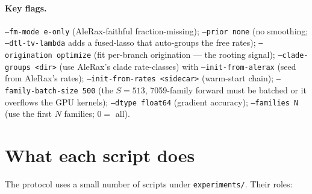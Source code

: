 \documentclass[11pt]{article}
\newcommand{\code}[1]{\texttt{\small #1}}
\begin{document}
\paragraph{Key flags.} \code{--fm-mode e-only} (AleRax-faithful fraction-missing);
\code{--prior none} (no smoothing; \code{--dtl-tv-lambda} adds a fused-lasso that
auto-groups the free rates); \code{--origination optimize} (fit per-branch origination ---
the rooting signal); \code{--clade-groups <dir>} (use AleRax's clade rate-classes) with
\code{--init-from-alerax} (seed from AleRax's rates); \code{--init-from-rates <sidecar>}
(warm-start chain); \code{--family-batch-size 500} (the $S{=}513$, 7059-family forward must
be batched or it overflows the GPU kernels); \code{--dtype float64} (gradient accuracy);
\code{--families N} (use the first $N$ families; $0=$ all).

\FloatBarrier
\section{What each script does}
\label{sec:software}
The protocol uses a small number of scripts under \code{experiments/}. Their roles:
\end{document}

